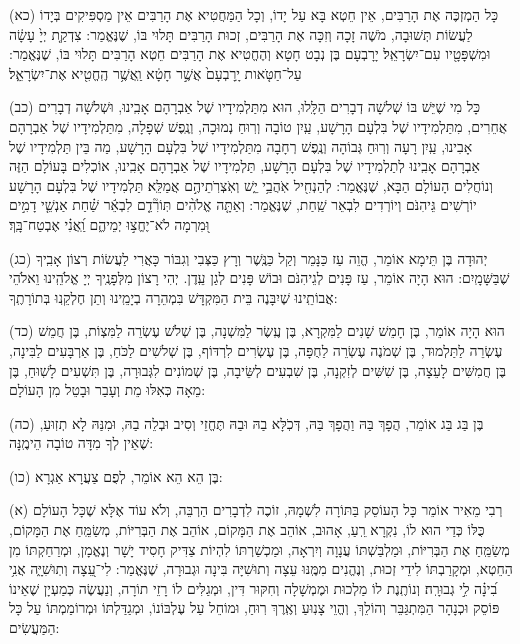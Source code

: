 \documentclass[twoside, openany, parskip=half, 11pt]{book}
\begin{document}
(כא)
כָּל הַמְזְכֶּה אֶת הָרַבִּים, אֵין חֵטְא בָּא עַל יָדוֹ, וְכָל הַמַּחֲטִיא אֶת הָרַבִּים אֵין מַסְפִּיקִים בְּיָדוֹ לַעֲשׂוֹת תְּשׁוּבָה, מֹשֶׁה זָכָה וְזִכָּה אֶת הָרַבִּים, זְכוּת הָרַבִּים תָּלוּי בּוֹ, שֶׁנֶּאֱמַר:  צִדְקַ֤ת יְיָ֙ עָשָׂ֔ה וּמִשְׁפָּטָ֖יו עִם־יִשְׂרָאֵֽל׃ יָרָבְעָם בֶּן נְבָט חָטָא וְהֶחֱטִיא אֶת הָרַבִּים חֵטְא הָרַבִּים תָּלוּי בּוֹ, שֶׁנֶּאֱמַר:  עַל־חַטֹּ֤אות יָֽרָבְעָם֙ אֲשֶׁ֣ר חָטָ֔א וַֽאֲשֶׁ֥ר הֶֽחֱטִ֖יא אֶת־יִשְׂרָאֵ֑ל׃

(כב)
 כָּל מִי שֶׁיֵּשׁ בּוֹ שְׁלשָׁה דְבָרִים הַלָּֽלוּ, הוּא מִתַּלְמִידָיו שֶׁל אַבְרָהָם אָבִֽינוּ, וּשְׁלשָׁה דְבָרִים אֲחֵרִים, מִתַּלְמִידָיו שֶׁל בִּלְעָם הָרָשָׁע, עַֽיִן טוֹבָה וְרֽוּחַ נְמוּכָה, וְנֶֽפֶשׁ שְׁפָלָה, מִתַּלְמִידָיו שֶׁל אַבְרָהָם אָבִינוּ, עַֽיִן רָעָה וְרֽוּחַ גְּבוֹהָה וְנֶֽפֶשׁ רְחָבָה מִתַּלְמִידָיו שֶׁל בִּלְעָם הָרָשָׁע, מַה בֵּין תַּלְמִידָיו שֶׁל אַבְרָהָם אָבִֽינוּ לְתַלְמִידָיו שֶׁל בִּלְעָם הָרָשָׁע, תַּלְמִידָיו שֶׁל אַבְרָהָם אָבִֽינוּ, אוֹכְלִים בָּעוֹלָם הַזֶּה וְנוֹחֲלִים הָעוֹלָם הַבָּא,       שֶׁנֶּאֱמַר:  לְהַנְחִ֖יל אֹֽהֲבַ֥י יֵ֑שׁ וְאֹֽצְרֹֽתֵיהֶ֣ם אֲמַלֵּֽא׃ תַּלְמִידָיו שֶׁל בִּלְעָם הָרָשָׁע יוֹרְשִׁים גֵּיהִנֹּם וְיוֹרְדִים לִבְאֵר שַֽׁחַת, שֶׁנֶּאֱמַר:  וְאַתָּ֤ה אֱלֹהִ֨ים   תּֽוֹרִ֘דֵ֤ם לִבְאֵ֬ר שַׁ֗חַת אַנְשֵׁ֤י דָמִ֣ים וּ֭מִרְמָה לֹא־יֶחֱצ֣וּ יְמֵיהֶ֑ם וַֽ֝אֲנִ֗י אֶבְטַח־בָּֽךְ׃

(כג)
 יְהוּדָה בֶּן תֵּימָא אוֹמֵר, הֱוֵה עַז כַּנָּמֵר וְקַל כַּנֶּֽשֶׁר וְרָץ כַּצְּבִי וְגִבּוֹר כָּאֲרִי לַעֲשׂוֹת רְצוֹן אָבִֽיךָ שֶׁבַּשָּׁמָֽיִם: הוּא הָיָה אוֹמֵר, עַז פָּנִים לְגֵיהִנֹּם וּבוֹשׁ פָּנִים לְגַן עֵֽדֶן. יְהִי רָצוֹן מִלְּפָנֶֽיךָ יְיָ אֱלֹהֵֽינוּ וֵאלֹהֵי אֲבוֹתֵֽינוּ שֶׁיִבָּנֶה בֵּית הַמִּקְדָּשׁ בִּמְהֵרָה בְיָמֵֽינוּ וְתֵן חֶלְקֵֽנוּ בְּתוֹרָתֶֽךָ: 

(כד)
הוּא הָיָה אוֹמֵר, בֶּן חָמֵשׁ שָׁנִים לַמִּקְרָא, בֶּן עֶֽשֶׂר לַמִּשְׁנָה, בֶּן שְׁלֹשׁ עֶשְׂרֵה לַמִּצְוֹת, בֶּן חֲמֵשׁ עֶשְׂרֵה לַתַּלְמוּד, בֶּן שְׁמֹנֶה עֶשְׂרֵה לַחֻפָּה, בֶּן עֶשְׂרִים לִרְדּוֹף, בֶּן שְׁלשִׁים לַכֹּחַ, בֶּן אַרְבָּעִים לַבִּינָה, בֶּן חֲמִשִּׁים לָעֵצָה, בֶּן שִׁשִּׁים לְזִקְנָה, בֶּן שִׁבְעִים לְשֵּׂיבָה,  בֶּן שְׁמוֹנִים לִגְּבוּרָה, בֶּן תִּשְׁעִים לָשֽׁוּחַ, בֶּן מֵאָה כְּאִלּוּ מֵת וְעָבַר וּבָטֵל מִן הָעוֹלָם: 

(כה)
בֶּן בַּג בַּג אוֹמֵר, הֲפָךְ בַּהּ וַהֲפָךְ בַּהּ, דְּכֹֽלָּא בַהּ וּבַהּ תֶּחֱזֵי וְסִיב וּבְלֵה בַהּ, וּמִנַּהּ לָא תְזֽוּעַ, שֶׁאֵין לְךָ מִדָּה טוֹבָה הֵימֶֽנָּה: 

(כו)
 בֶּן הֵא הֵא אוֹמֵר, לְפֻם צַעֲרָא אַגְרָא: 



\kolyisroel

(א)
 רְבִי מֵאִיר אוֹמֵר כָּל הָעוֹסֵק בַּתּוֹרָה לִשְׁמָהּ, זוֹכֶה לִדְבָרִים הַרְבֵּה, וְלֹא עוֹד אֶלָּא שֶׁכָּל הָעוֹלָם כֻּלּוֹ כְּדַי הוּא לוֹ, נִקְרָא רֵֽעַ, אָהוּב, אוֹהֵב אֶת הַמָּקוֹם, אוֹהֵב אֶת הַבְּרִיּוֹת, מְשַׂמֵּֽחַ אֶת הַמָּקוֹם, מְשַׂמֵּֽחַ אֶת הַבְּרִיּוֹת, וּמַלְבַּשְׁתּוֹ עֲנָוָה וְיִרְאָה, וּמַכְשַׁרְתּוֹ לִהְיוֹת צַדִּיק חָסִיד יָשָׁר וְנֶאֱמָן, וּמְרַחַקְתּוֹ מִן הַחֵטְא, וּמְקָרַבְתּוֹ לִידֵי זְכוּת, וְנֶהֱנִים מִמֶּֽנּוּ עֵצָה וְתוּשִׁיָּה בִּינָה וּגְבוּרָה, שֶׁנֶּאֱמַר:  לִי־עֵ֭צָה וְתֽוּשִׁיָּ֑ה אֲנִ֥י בִ֝ינָ֗ה לִ֣י גְבוּרָֽה׃ וְנוֹתֶֽנֶת לוֹ מַלְכוּת וּמֶמְשָׁלָה וְחִקּוּר דִּין, וּמְגַלִּים לוֹ רָזֵי תוֹרָה, וְנַעֲשֶׂה כְּמַעְיָן שֶׁאֵינוֹ פּוֹסֵק וּכְנָהָר הַמִּתְגַּבֵּר וְהוֹלֵךְ, וְהֱוֵי צָנֽוּעַ וְאֶֽרֶךְ רֽוּחַ, וּמוֹחֵל עַל עֶלְבּוֹנוֹ, וּמְגַדַּלְתּוֹ וּמְרוֹמַמְתּוֹ עַל כָּל הַמַּעֲשִׂים: 
\end{document}
